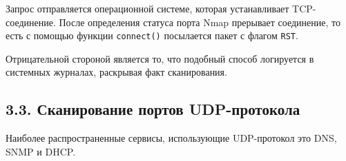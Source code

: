 Запрос отправляется операционной системе, которая устанавливает TCP-соединение. После определения статуса порта Nmap прерывает соединение, то есть с помощью функции \texttt{connect()} посылается пакет с флагом \texttt{RST}.

Отрицательной стороной является то, что подобный способ логируется в системных журналах, раскрывая факт сканирования.

\subsection*{3.3. Сканирование портов UDP-протокола}

Наиболее распространенные сервисы, использующие UDP-протокол это DNS, SNMP и DHCP.

